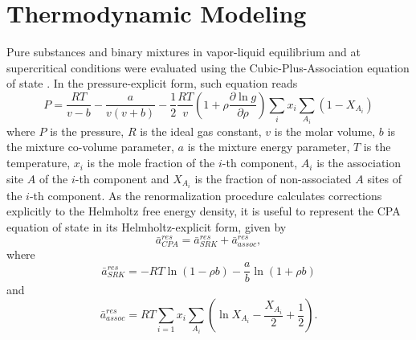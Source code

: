 \documentclass[preprint,12pt,3p]{elsarticle}
\begin{document}
\section{Thermodynamic Modeling}
    Pure substances and binary mixtures in vapor-liquid equilibrium and at supercritical conditions were evaluated using the Cubic-Plus-Association equation of state  \citep{kontogeorgis1996equation}. In the pressure-explicit form, such equation reads
\begin{equation} \label{eq:pressure_cpa}
P = \frac{RT}{v-b}-\frac{a}{v(v+b)}-\frac{1}{2}\frac{RT}{v} \left(1+\rho\frac{\partial \ln g}{\partial \rho}\right)\sum_{i} x_{i} \sum_{A_{i}}(1-X_{A_{i}})
\end{equation}
    where $P$ is the pressure, $R$ is the ideal gas constant, $v$ is the molar volume, $b$ is the mixture co-volume parameter, $a$ is the mixture energy parameter, $T$ is the temperature, $x_{i}$ is the mole fraction of the $i$-th component, $A_{i}$ is the association site $A$ of the $i$-th component and $X_{A_{i}}$ is the fraction of non-associated $A$ sites of the $i$-th component. As the renormalization procedure calculates corrections explicitly to the Helmholtz free energy density, it is useful to represent the CPA equation of state in its Helmholtz-explicit form, given by
\begin{equation} \label{eq:helm_res_cpa}
\bar{a}_{CPA}^{res} =\bar{a}_{SRK}^{res} + \bar{a}_{assoc}^{res},
\end{equation}
where
\begin{equation} \label{eq:helm_res_srk}
\bar{a}_{SRK}^{res} = -RT\ln(1-\rho b)-\frac{a}{b}\ln(1+\rho b)   
\end{equation}
and
\begin{equation} \label{eq:helm_res_assoc}
\bar{a}_{assoc}^{res} = RT\sum_{i=1} x_{i} \sum_{A_{i}}\left(\ln X_{A_{i}} - \frac{X_{A_{i}}}{2} + \frac{1}{2}\right).
\end{equation}
\end{document}
